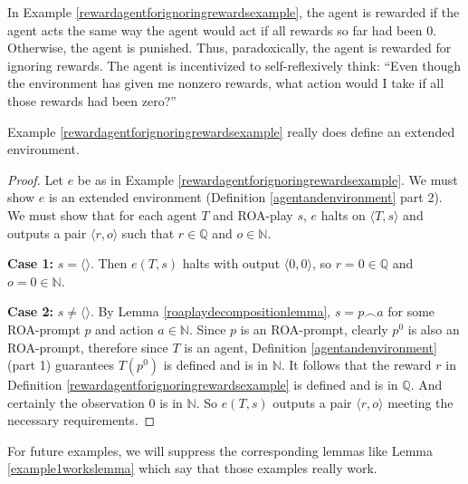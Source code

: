 \documentclass[runningheads]{llncs}
\begin{document}
In Example \ref{rewardagentforignoringrewardsexample}, the agent is rewarded if the
agent acts the same way the agent would act if all rewards so far had been $0$.
Otherwise, the agent is punished. Thus, paradoxically, the agent is rewarded for
ignoring rewards. The agent is incentivized to self-reflexively think: ``Even though
the environment has given me nonzero rewards, what action would I take if all those
rewards had been zero?''

\begin{lemma}
\label{example1workslemma}
    Example \ref{rewardagentforignoringrewardsexample} really does define an
    extended environment.
\end{lemma}

\begin{proof}
    Let $e$ be as in
    Example \ref{rewardagentforignoringrewardsexample}.
    We must show $e$ is an extended environment (Definition \ref{agentandenvironment}
    part 2). We must show that for each agent $T$ and ROA-play $s$,
    $e$ halts on $\langle T,s\rangle$ and outputs a pair $\langle r,o\rangle$
    such that $r\in\mathbb Q$ and $o\in\mathbb N$.

    \textbf{Case 1:} $s=\langle\rangle$. Then $e(T,s)$ halts with output
    $\langle 0,0\rangle$, so $r=0\in\mathbb Q$ and $o=0\in\mathbb N$.

    \textbf{Case 2:} $s\not=\langle\rangle$. By Lemma \ref{roaplaydecompositionlemma},
    $s=p\frown a$ for some ROA-prompt $p$ and action $a\in\mathbb N$.
    Since $p$ is an ROA-prompt, clearly $p^0$ is also an ROA-prompt, therefore
    since $T$ is an agent, Definition \ref{agentandenvironment} (part 1)
    guarantees $T(p^0)$ is defined and is in $\mathbb N$. It follows that the reward
    $r$ in Definition \ref{rewardagentforignoringrewardsexample} is defined and is in
    $\mathbb Q$. And certainly the observation $0$ is in $\mathbb N$.
    So $e(T,s)$ outputs a pair $\langle r,o\rangle$ meeting the necessary
    requirements.
\end{proof}

For future examples, we will suppress the corresponding lemmas like
Lemma \ref{example1workslemma} which say that those examples really work.
\end{document}
